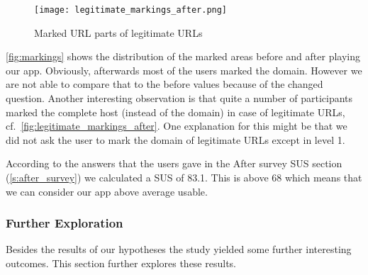 \begin{description}[leftmargin=0cm]
\begin{figure}
\centering
\texttt{[image: legitimate\_markings\_after.png]}
\caption{Marked URL parts of legitimate URLs}
\label{fig:legitimate_markings_after}
\end{figure}
\autoref{fig:markings} shows the distribution of the marked areas before and after playing our app. Obviously, afterwards most of the users marked the domain. However we are not able to compare that to the before values because of the changed question.
Another interesting observation is that quite a number of participants marked the complete host (instead of the domain) in case of legitimate URLs, cf.~\autoref{fig:legitimate_markings_after}. One explanation for this might be that we did not ask the user to mark the domain of legitimate URLs except in level 1.
\item[Hypothesis 4]
According to the answers that the users gave in the After survey SUS section (\autoref{s:after_survey}) we calculated a SUS of 83.1. This is above 68 which means that we can consider our app above average usable.
\end{description}

\subsubsection{Further Exploration}
\label{s:further_exploration}
Besides the results of our hypotheses the study yielded some further interesting outcomes.
This section further explores these results.


